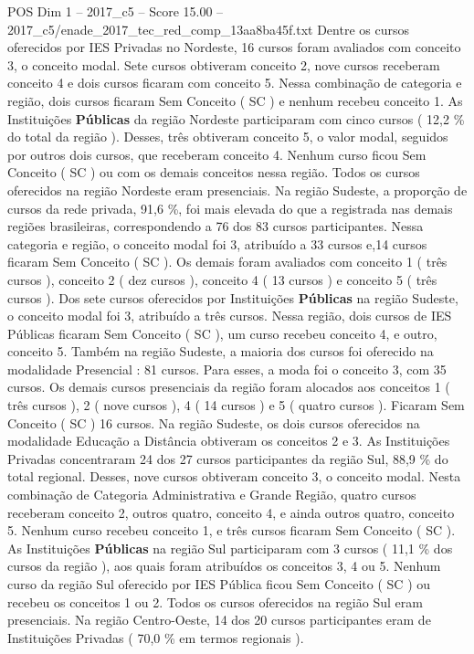 \begin{textsample}{POS Dim 1 – 2017\_c5 – Score 15.00 – 2017\_c5/enade\_2017\_tec\_red\_comp\_13aa8ba45f.txt}
Dentre os cursos oferecidos por IES Privadas no Nordeste, 16 cursos foram avaliados com conceito 3, o conceito modal.
Sete cursos obtiveram conceito 2, nove cursos receberam conceito 4 e dois cursos ficaram com conceito 5.
Nessa combinação de categoria e região, dois cursos ficaram Sem Conceito ( SC ) e nenhum recebeu conceito 1.
As Instituições \textbf{Públicas} da região Nordeste participaram com cinco cursos ( 12,2 \% do total da região ).
Desses, três obtiveram conceito 5, o valor modal, seguidos por outros dois cursos, que receberam conceito 4.
Nenhum curso ficou Sem Conceito ( SC ) ou com os demais conceitos nessa região.
Todos os cursos oferecidos na região Nordeste eram presenciais.
Na região Sudeste, a proporção de cursos da rede privada, 91,6 \%, foi mais elevada do que a registrada nas demais regiões brasileiras, correspondendo a 76 dos 83 cursos participantes.
Nessa categoria e região, o conceito modal foi 3, atribuído a 33 cursos e,14 cursos ficaram Sem Conceito ( SC ).
Os demais foram avaliados com conceito 1 ( três cursos ), conceito 2 ( dez cursos ), conceito 4 ( 13 cursos ) e conceito 5 ( três cursos ).
Dos sete cursos oferecidos por Instituições \textbf{Públicas} na região Sudeste, o conceito modal foi 3, atribuído a três cursos.
Nessa região, dois cursos de IES Públicas ficaram Sem Conceito ( SC ), um curso recebeu conceito 4, e outro, conceito 5.
Também na região Sudeste, a maioria dos cursos foi oferecido na modalidade Presencial : 81 cursos.
Para esses, a moda foi o conceito 3, com 35 cursos.
Os demais cursos presenciais da região foram alocados aos conceitos 1 ( três cursos ), 2 ( nove cursos ), 4 ( 14 cursos ) e 5 ( quatro cursos ).
Ficaram Sem Conceito ( SC ) 16 cursos.
Na região Sudeste, os dois cursos oferecidos na modalidade Educação a Distância obtiveram os conceitos 2 e 3.
As Instituições Privadas concentraram 24 dos 27 cursos participantes da região Sul, 88,9 \% do total regional.
Desses, nove cursos obtiveram conceito 3, o conceito modal.
Nesta combinação de Categoria Administrativa e Grande Região, quatro cursos receberam conceito 2, outros quatro, conceito 4, e ainda outros quatro, conceito 5.
Nenhum curso recebeu conceito 1, e três cursos ficaram Sem Conceito ( SC ).
As Instituições \textbf{Públicas} na região Sul participaram com 3 cursos ( 11,1 \% dos cursos da região ), aos quais foram atribuídos os conceitos 3, 4 ou 5.
Nenhum curso da região Sul oferecido por IES Pública ficou Sem Conceito ( SC ) ou recebeu os conceitos 1 ou 2.
Todos os cursos oferecidos na região Sul eram presenciais.
Na região Centro-Oeste, 14 dos 20 cursos participantes eram de Instituições Privadas ( 70,0 \% em termos regionais ).

\end{textsample}

